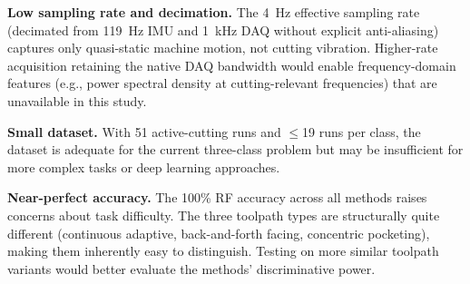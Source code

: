 \textbf{Low sampling rate and decimation.} The \SI{4}{\hertz} effective sampling rate (decimated from \SI{119}{\hertz} IMU and \SI{1}{\kilo\hertz} DAQ without explicit anti-aliasing) captures only quasi-static machine motion, not cutting vibration. Higher-rate acquisition retaining the native DAQ bandwidth would enable frequency-domain features (e.g., power spectral density at cutting-relevant frequencies) that are unavailable in this study.

\textbf{Small dataset.} With 51 active-cutting runs and $\leq$19 runs per class, the dataset is adequate for the current three-class problem but may be insufficient for more complex tasks or deep learning approaches.

\textbf{Near-perfect accuracy.} The 100\% RF accuracy across all methods raises concerns about task difficulty. The three toolpath types are structurally quite different (continuous adaptive, back-and-forth facing, concentric pocketing), making them inherently easy to distinguish. Testing on more similar toolpath variants would better evaluate the methods' discriminative power.
